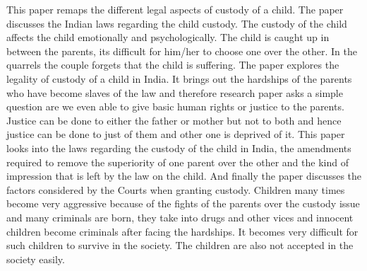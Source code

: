\begin{multicols}{2}
\noi
This paper remaps the different legal aspects of custody of a child. The paper discusses the Indian
laws regarding the child custody. The custody of the child affects the child emotionally and
psychologically. The child is caught up in between the parents, its difficult for him/her to choose 
one over the other. In the quarrels the couple forgets that the child is suffering. The paper explores
the legality of custody of a child in India. It brings out the hardships of the parents who have
become slaves of the law and therefore research paper asks a simple question are we even able to
give basic human rights or justice to the parents. Justice can be done to either the father or mother
but not to both and hence justice can be done to just of them and other one is deprived of it. This
paper looks into the laws regarding the custody of the child in India, the amendments required to
remove the superiority of one parent over the other and the kind of impression that is left by the
law on the child. And finally the paper discusses the factors considered by the Courts when
granting custody. Children many times become very aggressive because of the fights of the
parents over the custody issue and many criminals are born, they take into drugs and other vices
and innocent children become criminals after facing the hardships. It becomes very difficult for
such children to survive in the society. The children are also not accepted in the society easily.

\vspace{-.1cm}


\vspace{-.1cm}


\end{multicols}
